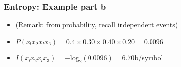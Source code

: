 \documentclass[a4]{beamer}
\begin{document}

\begin{frame}
\frametitle{Entropy: Example part b}
\begin{itemize}
\item (Remark: from probability, recall independent events) \bigskip
\item $P(x_lx_2x_lx_3) = 0.4\times 0.30 \times 0.40 \times 0.20  = 0.0096$ \bigskip
\item $I(x_lx_2x_lx_3) = -\mbox{log}_2(0.0096)  = 6.70$b/symbol \bigskip
\end{itemize}
\end{frame}
\end{document}
